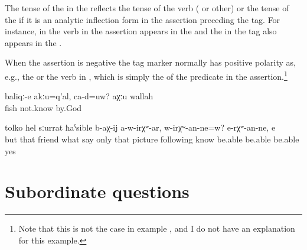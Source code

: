 The tense of the  in the  reflects the tense of the verb ( or other) or the tense of the  if it is an analytic inflection form in the assertion preceding the tag. For instance, in  the verb in the assertion appears in the  and the  in the tag also appears in the .

When the assertion is negative the tag marker normally has positive polarity as, e.g., the    or the verb in , which is simply the  of the predicate in the assertion.\footnote{Note that this is not the case in example , and I do not have an explanation for this example.}
%
\begin{exe}
	\ex	\label{ex:(These) are not fish, are they? By God, I don't know}
	\gll	baliqː-e	akːu=q'al,	ca-d=uw? 	aχːu	wallah\\
		fish		 	not.know	by.God\\
	\glt	{}

	\ex	\label{ex:And these friends, what they are saying, only by means of the picture, (one) cannot know, can one? One cannot know, yes}
	\gll	[a	iš-tːi	juldašː-e	ce	b-ik'-ul=el]	tolko	hel sːurrat	ħaˁsible	b-aχ-ij	a-w-irχʷ-ar,	w-irχʷ-an-ne=w? 		e-rχʷ-an-ne,	e\\
		but	that	friend	what	say	only	that picture	following	know	be.able be.able	be.able	yes\\
	\glt	{}
\end{exe}



\section{Subordinate questions}
\label{sec:Subordinate questions}

